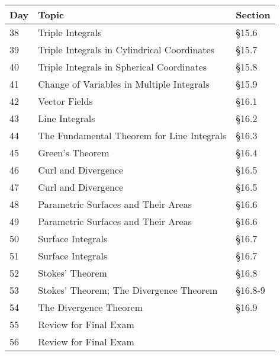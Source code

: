 \documentclass[11pt]{article}
\begin{document}
\begin{tabular}{|l|l|l|} %
\hline
Day& Topic &  Section\\
\hline 
38&Triple Integrals&\S15.6  \\
39&Triple Integrals in Cylindrical Coordinates&\S15.7  \\
40&Triple Integrals in Spherical Coordinates&\S15.8 \\

41&Change of Variables in Multiple Integrals&\S15.9 \\
42&Vector Fields&\S16.1  \\
43&Line Integrals&\S16.2  \\
44&The Fundamental Theorem for Line Integrals&\S16.3  \\

45& Green's Theorem&\S16.4  \\
46&Curl and Divergence&\S16.5  \\
47&Curl and Divergence&\S16.5  \\
48&Parametric Surfaces and Their Areas& \S16.6\\

49&Parametric Surfaces and Their Areas& \S16.6\\
50&Surface Integrals &  \S16.7\\
51&Surface Integrals & \S16.7 \\
52& Stokes' Theorem & \S16.8  \\ 

53& Stokes' Theorem; The Divergence Theorem &\S 16.8-9 \\ 
54&The Divergence Theorem&\S 16.9\\ 
55&Review for Final Exam& \\ 
56&Review for Final Exam&  \\ 

\hline

\end{tabular}
\end{document}
